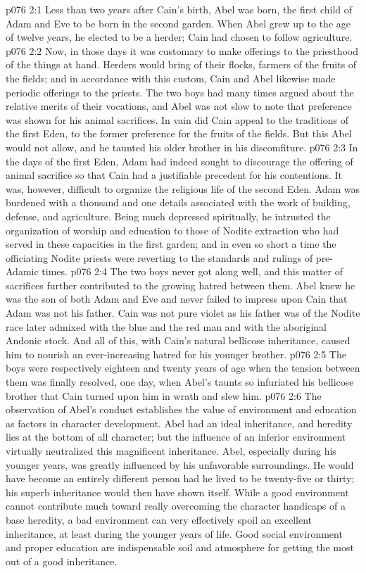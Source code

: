 \vs p076 2:1 Less than two years after Cain’s birth, Abel was born, the first child of Adam and Eve to be born in the second garden. When Abel grew up to the age of twelve years, he elected to be a herder; Cain had chosen to follow agriculture.
\vs p076 2:2 Now, in those days it was customary to make offerings to the priesthood of the things at hand. Herders would bring of their flocks, farmers of the fruits of the fields; and in accordance with this custom, Cain and Abel likewise made periodic offerings to the priests. The two boys had many times argued about the relative merits of their vocations, and Abel was not slow to note that preference was shown for his animal sacrifices. In vain did Cain appeal to the traditions of the first Eden, to the former preference for the fruits of the fields. But this Abel would not allow, and he taunted his older brother in his discomfiture.
\vs p076 2:3 In the days of the first Eden, Adam had indeed sought to discourage the offering of animal sacrifice so that Cain had a justifiable precedent for his contentions. It was, however, difficult to organize the religious life of the second Eden. Adam was burdened with a thousand and one details associated with the work of building, defense, and agriculture. Being much depressed spiritually, he intrusted the organization of worship and education to those of Nodite extraction who had served in these capacities in the first garden; and in even so short a time the officiating Nodite priests were reverting to the standards and rulings of pre\hyp{}Adamic times.
\vs p076 2:4 The two boys never got along well, and this matter of sacrifices further contributed to the growing hatred between them. Abel knew he was the son of both Adam and Eve and never failed to impress upon Cain that Adam was not his father. Cain was not pure violet as his father was of the Nodite race later admixed with the blue and the red man and with the aboriginal Andonic stock. And all of this, with Cain’s natural bellicose inheritance, caused him to nourish an ever\hyp{}increasing hatred for his younger brother.
\vs p076 2:5 The boys were respectively eighteen and twenty years of age when the tension between them was finally resolved, one day, when Abel’s taunts so infuriated his bellicose brother that Cain turned upon him in wrath and slew him.
\pc \vs p076 2:6 The observation of Abel’s conduct establishes the value of environment and education as factors in character development. Abel had an ideal inheritance, and heredity lies at the bottom of all character; but the influence of an inferior environment virtually neutralized this magnificent inheritance. Abel, especially during his younger years, was greatly influenced by his unfavorable surroundings. He would have become an entirely different person had he lived to be twenty\hyp{}five or thirty; his superb inheritance would then have shown itself. While a good environment cannot contribute much toward really overcoming the character handicaps of a base heredity, a bad environment can very effectively spoil an excellent inheritance, at least during the younger years of life. Good social environment and proper education are indispensable soil and atmosphere for getting the most out of a good inheritance.

